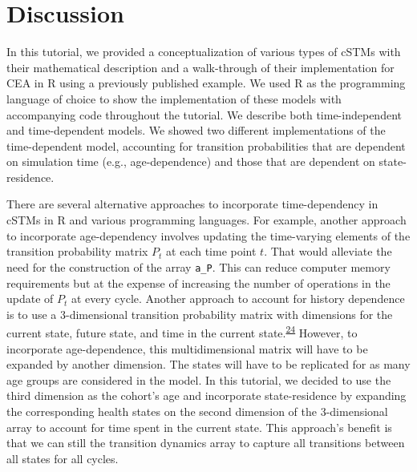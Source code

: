 \documentclass[
]{article}
\begin{document}
\hypertarget{discussion}{%
\section{Discussion}\label{discussion}}

In this tutorial, we provided a conceptualization of various types of cSTMs with their mathematical description and a walk-through of their implementation for CEA in R using a previously published example. We used R as the programming language of choice to show the implementation of these models with accompanying code throughout the tutorial. We describe both time-independent and time-dependent models. We showed two different implementations of the time-dependent model, accounting for transition probabilities that are dependent on simulation time (e.g., age-dependence) and those that are dependent on state-residence.

There are several alternative approaches to incorporate time-dependency in cSTMs in R and various programming languages. For example, another approach to incorporate age-dependency involves updating the time-varying elements of the transition probability matrix \(P_t\) at each time point \(t\). That would alleviate the need for the construction of the array \texttt{a\_P}. This can reduce computer memory requirements but at the expense of increasing the number of operations in the update of \(P_t\) at every cycle. Another approach to account for history dependence is to use a 3-dimensional transition probability matrix with dimensions for the current state, future state, and time in the current state.\textsuperscript{\protect\hyperlink{ref-Hawkins2005}{24}} However, to incorporate age-dependence, this multidimensional matrix will have to be expanded by another dimension. The states will have to be replicated for as many age groups are considered in the model. In this tutorial, we decided to use the third dimension as the cohort's age and incorporate state-residence by expanding the corresponding health states on the second dimension of the 3-dimensional array to account for time spent in the current state. This approach's benefit is that we can still the transition dynamics array to capture all transitions between all states for all cycles.
\end{document}
